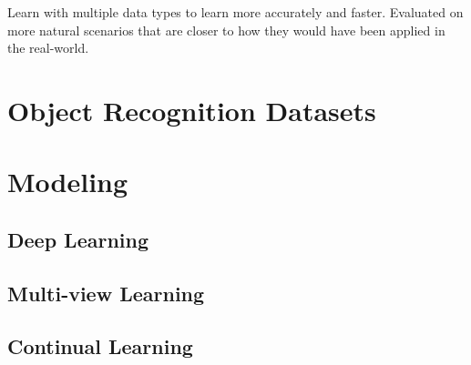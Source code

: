 Learn with multiple data types to learn more accurately and faster. Evaluated on more natural scenarios that are closer to how they would have been applied in the real-world. 





\section{Object Recognition Datasets}

\section{Modeling}

\subsection{Deep Learning}

\subsection{Multi-view Learning}

\subsection{Continual Learning}


